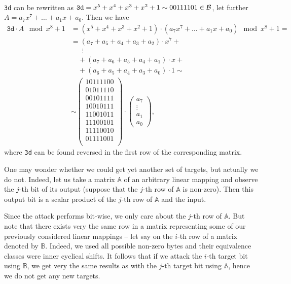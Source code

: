 \begin{example}
\label{ex:shiftmatrix}
	~ \\
	{\tt 3d} can be rewritten as $\texttt{3d} = x^5+x^4+x^3+x^2+1 \sim 00111101 \in\cal B$, let further $A = a_7x^7+\ldots+a_1x+a_0$. Then we have
	\begin{align*}
		\texttt{3d} \cdot A \mod{x^8+1} &= (x^5+x^4+x^3+x^2+1) \cdot (a_7x^7+\ldots+a_1x+a_0) \mod{x^8+1} = \\
		&= (a_7+a_5+a_4+a_3+a_2)\cdot x^7 + ~\\
		&\;\;\quad\vdots \\
		&\quad + (a_7+a_6+a_5+a_4+a_1)\cdot x + ~\\
		&\quad + (a_6+a_5+a_4+a_3+a_0)\cdot 1 \sim \\
		&\sim
		\begin{pmatrix}
			\boxed{10111100} \\
			01011110 \\
			00101111 \\
			10010111 \\
			11001011 \\
			11100101 \\
			11110010 \\
			01111001 \\
		\end{pmatrix}
		\cdot
		\begin{pmatrix}
			a_7 \\ \vdots \\ a_1 \\ a_0
		\end{pmatrix} ,
	\end{align*}
	where {\tt 3d} can be found reversed in the first row of the corresponding matrix.
\end{example}

One may wonder whether we could get yet another set of targets, but actually we do not. Indeed, let us take a matrix $\mathbb{A}$ of an arbitrary linear mapping and observe the $j$-th bit of its output (suppose that the $j$-th row of $\mathbb{A}$ is non-zero). Then this output bit is a scalar product of the $j$-th row of $\mathbb{A}$ and the input.

Since the attack performs bit-wise, we only care about the $j$-th row of $\mathbb{A}$. But note that there exists very the same row in a matrix representing some of our previously considered linear mappings -- let say on the $i$-th row of a matrix denoted by $\mathbb{B}$. Indeed, we used all possible non-zero bytes and their equivalence classes were inner cyclical shifts. It follows that if we attack the $i$-th target bit using $\mathbb{B}$, we get very the same results as with the $j$-th target bit using $\mathbb{A}$, hence we do not get any new targets.

